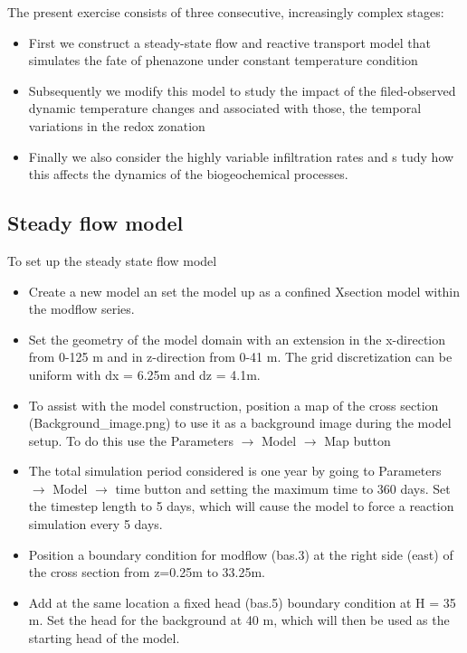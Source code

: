 The present exercise consists of three consecutive, increasingly complex stages: 
\begin{itemize}
\item First we construct a steady-state flow and reactive transport model that simulates 
the fate of phenazone under constant temperature condition
\item Subsequently we modify this model to study the impact of the filed-observed dynamic 
temperature changes and associated with those, the temporal variations in the redox zonation 
\item Finally we also consider the highly variable infiltration rates and s
tudy how this affects the dynamics of the biogeochemical processes.
\end{itemize}


\subsection[Steady flow model]{Steady flow model}
To set up the steady state flow model
\begin{itemize} 
\item Create a new model an set the model up as a 
{\color{blue}confined} 
{\color{blue}Xsection} model within the
{\color{blue}modflow series}.

\item Set the geometry of the model domain with an extension in the x-direction from 0-125 m 
and in z-direction from 0-41 m. 
The grid discretization can be uniform with dx = 6.25m and dz = 4.1m.

\item To assist with the model construction, 
position a map of the cross section (Background\_image.png) to use it as a background image during the model setup. 
To do this use the {\color{blue}Parameters} $\rightarrow$ {\color{blue}Model} $\rightarrow$ {\color{blue}Map} button

\item The total simulation period considered is one year by going to 
{\color{blue}Parameters} $\rightarrow$ {\color{blue}Model} $\rightarrow$ {\color{blue}time} button
and setting the maximum time to 360 days. Set the timestep length to 5 days, which will cause 
the model to force a reaction simulation every 5 days.

\item Position a boundary condition for modflow ({\color{blue}bas.3}) at the right side (east) 
of the cross section from z=0.25m to 33.25m. 

\item Add at the same location a fixed head ({\color{blue}bas.5}) boundary condition at H = 35 m. 
Set the head for the background at 40 m, which will then be used as the starting head of the model.
\end{itemize}

